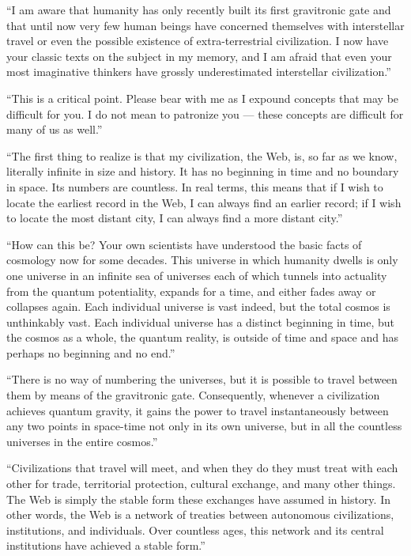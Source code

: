 \documentclass[english,11pt,letterpaper,onecolumn]{scrbook}
\begin{document}
	``I am aware that humanity has only recently built its first gravitronic gate and that until now very few human beings have concerned themselves with interstellar travel or even the possible existence of extra-terrestrial civilization.  I now have your classic texts on the subject in my memory, and I am afraid that even your most imaginative thinkers have grossly underestimated interstellar civilization.''
	
	``This is a critical point.  Please bear with me as I expound concepts that may be difficult for you.  I do not mean to patronize you --- these concepts are difficult for many of us as well.''
	
	``The first thing to realize is that my civilization, the Web, is, so far as we know, literally infinite in size and history.  It has no beginning in time and no boundary in space.  Its numbers are countless.  In real terms, this means that if I wish to locate the earliest record in the Web, I can always find an earlier record; if I wish to locate the most distant city, I can always find a more distant city.''
	
	``How can this be?  Your own scientists have understood the basic facts of cosmology now for some decades.  This universe in which humanity dwells is only one universe in an infinite sea of universes each of which tunnels into actuality from the quantum potentiality, expands for a time, and either fades away or collapses again.  Each individual universe is vast indeed, but the total cosmos is unthinkably vast.  Each individual universe has a distinct beginning in time, but the cosmos as a whole, the quantum reality, is outside of time and space and has perhaps no beginning and no end.''
	
	``There is no way of numbering the universes, but it is possible to travel between them by means of the gravitronic gate.  Consequently, whenever a civilization achieves quantum gravity, it gains the power to travel instantaneously between any two points in space-time not only in its own universe, but in all the countless universes in the entire cosmos.''
	
	``Civilizations that travel will meet, and when they do they must treat with each other for trade, territorial protection, cultural exchange, and many other things.  The Web is simply the stable form these exchanges have assumed in history.  In other words, the Web is a network of treaties between autonomous civilizations, institutions, and individuals.  Over countless ages, this network and its central institutions have achieved a stable form.''
	
\end{document}
